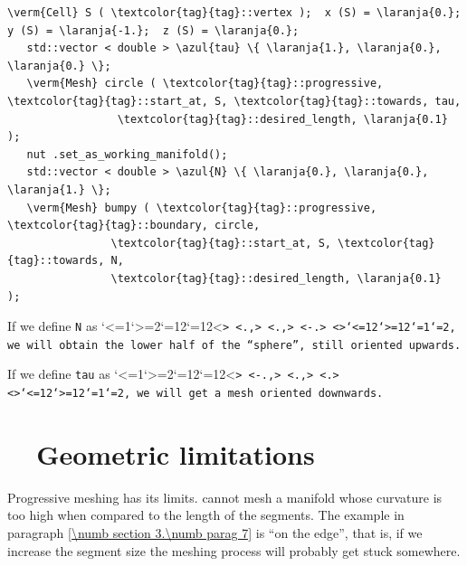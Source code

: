 \begin{Verbatim}[commandchars=\\\{\},formatcom=\small\tt,frame=single,
   label=parag-\ref{\numb section 3.\numb parag 15}.cpp,rulecolor=\color{coment},
   baselinestretch=0.94,framesep=2mm                                            ]
   \verm{Cell} S ( \textcolor{tag}{tag}::vertex );  x (S) = \laranja{0.};  y (S) = \laranja{-1.};  z (S) = \laranja{0.};
   std::vector < double > \azul{tau} \{ \laranja{1.}, \laranja{0.}, \laranja{0.} \};
   \verm{Mesh} circle ( \textcolor{tag}{tag}::progressive, \textcolor{tag}{tag}::start_at, S, \textcolor{tag}{tag}::towards, tau,
                 \textcolor{tag}{tag}::desired_length, \laranja{0.1}                               );
   nut .set_as_working_manifold();
   std::vector < double > \azul{N} \{ \laranja{0.}, \laranja{0.}, \laranja{1.} \};
   \verm{Mesh} bumpy ( \textcolor{tag}{tag}::progressive, \textcolor{tag}{tag}::boundary, circle,
                \textcolor{tag}{tag}::start_at, S, \textcolor{tag}{tag}::towards, N,
                \textcolor{tag}{tag}::desired_length, \laranja{0.1}                 );
\end{Verbatim}

If we define {\small\tt\azul N} as \catcode`<=1\catcode`>=2\catcode`{=12\catcode`}=12<\small\tt {>
<\small\tt {}\laranja.,> <\small\tt {}\laranja.,> <\small\tt \laranja-\laranja.> <\small\tt }>\catcode`<=12\catcode`>=12\catcode`{=1\catcode`}=2, we will obtain
the lower half of the ``sphere'', still oriented upwards.

If we define {\small\tt\azul tau} as \catcode`<=1\catcode`>=2\catcode`{=12\catcode`}=12<\small\tt {>
<\small\tt \laranja-\laranja.,> <\small\tt {}\laranja.,> <\small\tt {}\laranja.> <\small\tt }>\catcode`<=12\catcode`>=12\catcode`{=1\catcode`}=2, we will get a mesh
oriented downwards.


\section{~~Geometric limitations}\label{\numb section 3.\numb parag 16}

Progressive meshing has its limits.
{\ManiFEM} cannot mesh a manifold whose curvature is too high when compared to the
length of the segments.
The example in paragraph \ref{\numb section 3.\numb parag 7} is ``on the edge'', that is,
if we increase the segment size the meshing process will probably get stuck somewhere.

